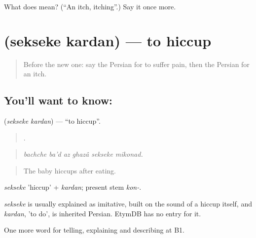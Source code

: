 \begin{tcolorbox}[breakable,colback=teal!4,colframe=teal!35!black,title={Before you move on}]
What does  mean? (\textquotedblleft{}An itch, itching\textquotedblright{}.) Say it once more.
\end{tcolorbox}
\section[\texorpdfstring{\fa{سکسکه} \fa{کردن} (sekseke kardan)}{سکسکه کردن (sekseke kardan)}]{  (sekseke kardan) — to hiccup}

\label{lesson:FA-C491-sekseke-kardan}



\begin{quote}
Before the new one: say the Persian for to suffer pain, then the Persian for an itch.
\end{quote}

\subsection*{You'll want to know:  }
\textbf{ } (\emph{sekseke kardan}) — \textquotedblleft{}to hiccup\textquotedblright{}.

\begin{quote}
     .
\end{quote}

\begin{quote}
\emph{bachche ba'd az ghazâ sekseke mikonad.}
\end{quote}

\begin{quote}
The baby hiccups after eating.
\end{quote}

\emph{sekseke} 'hiccup' + \emph{kardan}; present stem \emph{kon-}.

\begin{cousinweb}
\emph{sekseke} is usually explained as imitative, built on the sound of a hiccup itself, and \emph{kardan}, 'to do', is inherited Persian. EtymDB has no entry for it.
\end{cousinweb}

\begin{grammarlens}[title={What you've built}]
One more word for telling, explaining and describing at B1.
\end{grammarlens}

